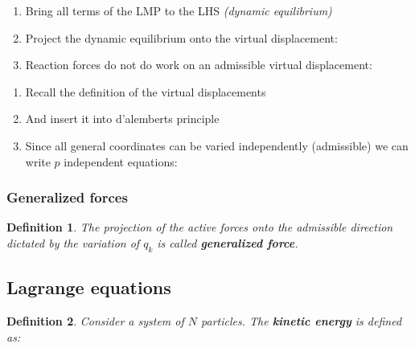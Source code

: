 \documentclass[10pt,a4paper]{scrartcl}
\newtheorem{define}{Definition}
\begin{document}
\begin{multicols*}{2}
\begin{enumerate}
\item Bring all terms of the LMP to the LHS \emph{(dynamic equilibrium)}

\item Project the dynamic equilibrium onto the virtual displacement:


\item Reaction forces do not do work on an admissible virtual displacement:

\end{enumerate}


\begin{enumerate}\addtocounter{enumi}{4}
\item Recall the definition of the virtual displacements

\item And insert it into d'alemberts principle
\item Since all general coordinates can be varied independently (admissible) we can write $p$ independent equations:
\end{enumerate}
\subsubsection{Generalized forces}
\begin{define}
The projection of the active forces onto the admissible direction dictated by the variation of $q_k$ is called \textbf{generalized force}.

\end{define}
\subsection{Lagrange equations}
\begin{define}
Consider a system of $N$ particles. The \textbf{kinetic energy} is defined as:


\end{define}
\end{multicols*}
\end{document}
